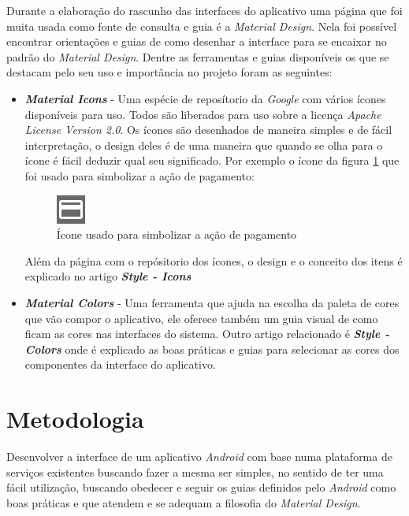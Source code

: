 \documentclass[hidelinks,12pt]{article}
\begin{document}
Durante a elabora\c{c}\~ao do rascunho das interfaces do aplicativo uma p\'agina \cite{material} que foi muita usada como fonte de consulta e guia \'e a \textit{Material Design}. Nela foi poss\'ivel encontrar orienta\c{c}\~oes e guias de como desenhar a interface para se encaixar no padr\~ao do \textit{Material Design}. Dentre as ferramentas e guias dispon\'iveis os que se destacam pelo seu uso e importância no projeto foram as seguintes:
\begin{itemize}
	\item \textbf{\textit{Material Icons}} \cite{materialicon} - Uma esp\'ecie de repos\'itorio da \textit{Google} com v\'arios \'icones dispon\'iveis para uso. Todos s\~ao liberados para uso sobre a licen\c{c}a \textit{Apache License Version 2.0}. Os \'icones s\~ao desenhados de maneira simples e de f\'acil interpreta\c{c}\~ao, o design deles \'e de uma maneira que quando se olha para o \'icone \'e f\'acil deduzir qual seu significado. Por exemplo o \'icone da figura \ref{icon_pay} que foi usado para simbolizar a a\c{c}\~ao de pagamento:
	\begin{figure}[h]
		\centering
		\includegraphics{pay_action_white}
		\caption{\'Icone usado para simbolizar a a\c{c}\~ao de pagamento}
		\label{icon_pay}
	\end{figure}
	
	Al\'em da p\'agina com o rep\'ositorio dos \'icones, o design e o conceito dos itens \'e explicado no artigo \textbf{\textit{Style - Icons}} \cite{materialiconguide}
	
	\item \textbf{\textit{Material Colors}} \cite{materialcolors} - Uma ferramenta \cite{materialcolorpallete} que ajuda na escolha da paleta de cores que v\~ao compor o aplicativo, ele oferece tamb\'em um guia visual de como ficam as cores nas interfaces do sistema. Outro artigo relacionado \'e \textbf{\textit{Style - Colors}} \cite{materialcolors} onde \'e explicado as boas pr\'aticas e guias para selecionar as cores dos componentes da interface do aplicativo.
\end{itemize}
\newpage
\section{Metodologia}
Desenvolver a interface de um aplicativo \textit{Android} com base numa plataforma de servi\c{c}os existentes buscando fazer a mesma ser simples, no sentido de ter uma f\'acil utiliza\c{c}\~ao, buscando obedecer e seguir os guias definidos pelo \textit{Android} como boas pr\'aticas e que atendem e se adequam a filosofia do \textit{Material Design}.
\end{document}
